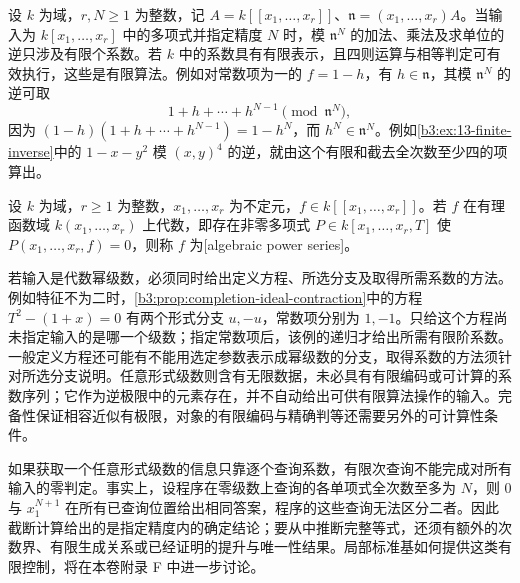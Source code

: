 设 \(k\) 为域，\(r,N\ge1\) 为整数，记 \(A=k[\![x_1,\ldots,x_r]\!]\)、\(\mathfrak n=(x_1,\ldots,x_r)A\)。当输入为 \(k[x_1,\ldots,x_r]\) 中的多项式并指定精度 \(N\) 时，模 \(\mathfrak n^N\) 的加法、乘法及求单位的逆只涉及有限个系数。若 \(k\) 中的系数具有有限表示，且四则运算与相等判定可有效执行，这些是有限算法。例如对常数项为一的 \(f=1-h\)，有 \(h\in\mathfrak n\)，其模 \(\mathfrak n^N\) 的逆可取
\[
	1+h+\cdots+h^{N-1}\pmod{\mathfrak n^N},
\]
因为 \((1-h)(1+h+\cdots+h^{N-1})=1-h^N\)，而 \(h^N\in\mathfrak n^N\)。例如\cref{b3:ex:13-finite-inverse}中的 \(1-x-y^2\) 模 \((x,y)^4\) 的逆，就由这个有限和截去全次数至少四的项算出。

\begin{definition}\label{b3:def:algebraic-series-input}
	设 \(k\) 为域，\(r\ge1\) 为整数，\(x_1,\ldots,x_r\) 为不定元，\(f\in k[\![x_1,\ldots,x_r]\!]\)。若 \(f\) 在有理函数域 \(k(x_1,\ldots,x_r)\) 上代数，即存在非零多项式 \(P\in k[x_1,\ldots,x_r,T]\) 使 \(P(x_1,\ldots,x_r,f)=0\)，则称 \(f\) 为[algebraic power series]。
\end{definition}

若输入是代数幂级数，必须同时给出定义方程、所选分支及取得所需系数的方法。例如特征不为二时，\cref{b3:prop:completion-ideal-contraction}中的方程 \(T^2-(1+x)=0\) 有两个形式分支 \(u,-u\)，常数项分别为 \(1,-1\)。只给这个方程尚未指定输入的是哪一个级数；指定常数项后，该例的递归才给出所需有限阶系数。一般定义方程还可能有不能用选定参数表示成幂级数的分支，取得系数的方法须针对所选分支说明。任意形式级数则含有无限数据，未必具有有限编码或可计算的系数序列；它作为逆极限中的元素存在，并不自动给出可供有限算法操作的输入。完备性保证相容近似有极限，对象的有限编码与精确判等还需要另外的可计算性条件。

\ProseParagraphBreak
如果获取一个任意形式级数的信息只靠逐个查询系数，有限次查询不能完成对所有输入的零判定。事实上，设程序在零级数上查询的各单项式全次数至多为 \(N\)，则 \(0\) 与 \(x_1^{N+1}\) 在所有已查询位置给出相同答案，程序的这些查询无法区分二者。因此截断计算给出的是指定精度内的确定结论；要从中推断完整等式，还须有额外的次数界、有限生成关系或已经证明的提升与唯一性结果。局部标准基如何提供这类有限控制，将在本卷附录 F 中进一步讨论。
